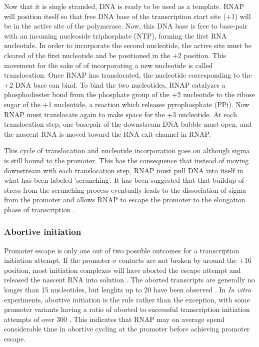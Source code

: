 Now that it is single stranded, DNA is ready to be used as a template. RNAP
will position itself so that free DNA base of the transcription start site (+1)
will be in the active site of the polymerase. Now, this DNA base is free to
base-pair with an incoming nucleoside triphosphate (NTP), forming the first RNA
nucleotide. In order to incorporate the second nucleotide, the active site must
be cleared of the first nucleotide and be positioned in the +2 position. This movement
for the sake of of incorporating a new nucleotide is called translocation. Once
RNAP has translocated, the nucleotide corresponding to the +2 DNA base can
bind. To bind the two nucleotides, RNAP catalyzes a phosphodiester bond from
the phosphate group of the +2 nucleotide to the ribose sugar of the +1
nucleotide, a reaction which releases pyrophosphate (PPi). Now RNAP must
translocate again to make space for the +3 nucleotide. At each translocation
step, one basepair of the downstream DNA bubble must open, and the nascent RNA
is moved toward the RNA exit channel in RNAP.

This cycle of translocation and nucleotide incorporation goes on although sigma
is still bound to the promoter. This has the consequence that instead of moving
downstream with each translocation step, RNAP must pull DNA into itself in what
has been labeled 'scrunching'. It has been suggested that that buildup of
stress from the scrunching process eventually leads to the dissociation of
sigma from the promoter and allows RNAP to escape the promoter to the
elongation phase of transcription \cite{revyakin_abortive_2006}.

\subsubsection{Abortive initiation}
Promoter escape is only one out of two possible outcomes for a transcription
initiation attempt. If the promoter-$\sigma$ contacts are not broken by around
the +16 position, most initiation complexes will have aborted the escape
attempt and released the nascent RNA into solution
\cite{lilian_m_promoter_2002}. The aborted transcripts are generally no longer
than 15 nucleotides, but lenghts up to 20 have been observed
\cite{chander_alternate_2007}. In \textit{In vitro} experiments, abortive
initiation is the rule rather than the exception, with some promoter variants
having a ratio of aborted to successful transcription initiation attempts of
over 300 \cite{hsu_initial_2006}. This indicates that RNAP may on average spend
considerable time in abortive cycling at the promoter before achieving promoter
escape.

